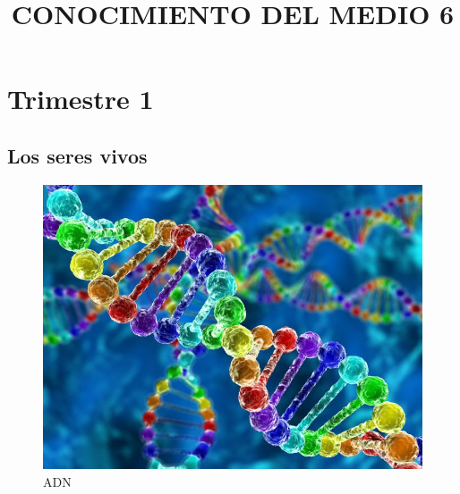 \documentclass[12pt, a4paper]{book}
\title{CONOCIMIENTO DEL MEDIO 6}
\author{}
\date{}
\begin{document}
\maketitle

\begin{titlepage}
\maketitle
\end{titlepage}

\renewcommand{\contentsname}{\'Indice}                               %
\tableofcontents                                                     %

\part*{Trimestre 1}

\chapter{Los seres vivos}

\begin{figure}[ht]
    \centering
    \includegraphics[width=1\linewidth]{Tema1/00_ADN.jpg}
    \caption{ADN}
    \label{fig:adn}
\end{figure}





\end{document}
